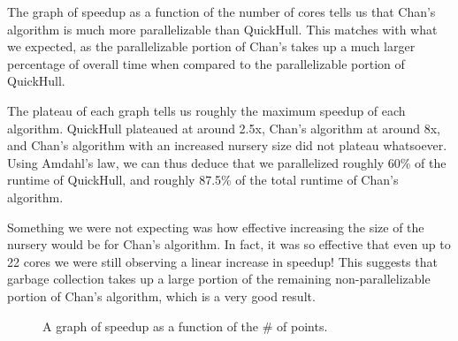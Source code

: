 \documentclass[12pt]{article}
\begin{document}
    The graph of speedup as a function of the number of cores tells us that Chan’s algorithm is much more parallelizable than QuickHull. This matches with what we expected, as the parallelizable portion of Chan’s takes up a much larger percentage of overall time when compared to the parallelizable portion of QuickHull.

    The plateau of each graph tells us roughly the maximum speedup of each algorithm. QuickHull plateaued at around 2.5x, Chan’s algorithm at around 8x, and Chan’s algorithm with an increased nursery size did not plateau whatsoever. Using Amdahl’s law, we can thus deduce that we parallelized roughly 60\% of the runtime of QuickHull, and roughly 87.5\% of the total runtime of Chan’s algorithm.

    Something we were not expecting was how effective increasing the size of the nursery would be for Chan’s algorithm. In fact, it was so effective that even up to 22 cores we were still observing a linear increase in speedup! This suggests that garbage collection takes up a large portion of the remaining non-parallelizable portion of Chan’s algorithm, which is a very good result.

    \begin{figure}[h!]
      \centering
      \caption{A graph of speedup as a function of the \# of points.}
    \end{figure}
    
\end{document}
